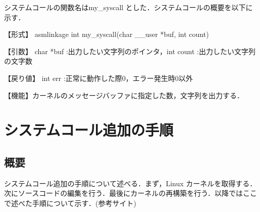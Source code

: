 \documentclass[12pt]{jsarticle}
\begin{document}
システムコールの関数名はmy\_syscall とした．システムコールの概要を以下に示す．

【形式】 asmlinkage int my\_syscall(char \_\_user *buf, int count)

【引数】 char *buf :出力したい文字列のポインタ，int count :出力したい文字列の文字数

【戻り値】 int err :正常に動作した際0，エラー発生時0以外

【機能】カーネルのメッセージバッファに指定した数，文字列を出力する．

\section{システムコール追加の手順}\label{sec:tejun}
 \subsection{概要}
システムコール追加の手順について述べる．まず，Linux カーネルを取得する．次にソースコードの編集を行う．最後にカーネルの再構築を行う．以降ではここで述べた手順について示す．(参考サイト\cite{syscall})
\end{document}
